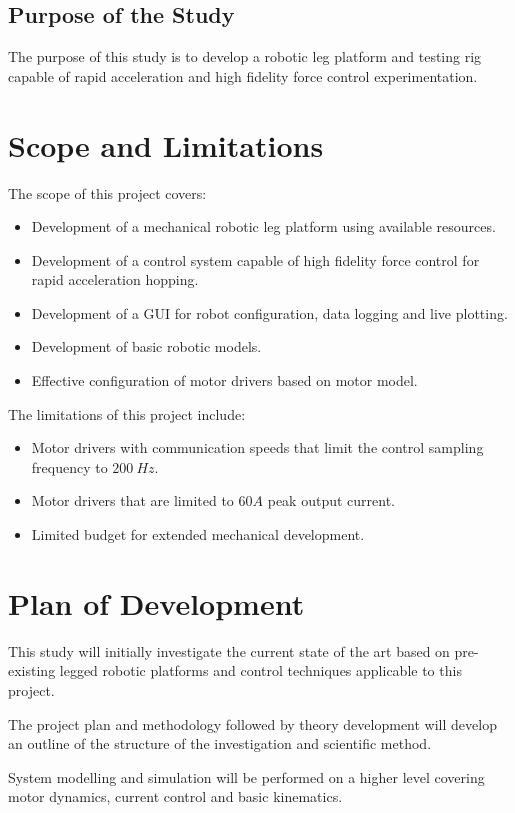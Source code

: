 \subsection{Purpose of the Study}
The purpose of this study is to develop a robotic leg platform and testing rig capable of rapid acceleration and high fidelity force control experimentation.

\section{Scope and Limitations}
The scope of this project covers:
\begin{itemize}
\item Development of a mechanical robotic leg platform using available resources.
\item Development of a control system capable of high fidelity force control for rapid acceleration hopping.
\item Development of a GUI for robot configuration, data logging and live plotting.
\item Development of basic robotic models.
\item Effective configuration of motor drivers based on motor model.
\end{itemize}

The limitations of this project include:
\begin{itemize}
\item Motor drivers with communication speeds that limit the control sampling frequency to $200\ Hz$.
\item Motor drivers that are limited to $60 A$ peak output current.
\item Limited budget for extended mechanical development.
\end{itemize}

\section{Plan of Development}
This study will initially investigate the current state of the art based on pre-existing legged robotic platforms and control techniques applicable to this project. 

The project plan and methodology followed by theory development will develop an outline of the structure of the investigation and scientific method.

System modelling and simulation will be performed on a higher level covering motor dynamics, current control and basic kinematics.

